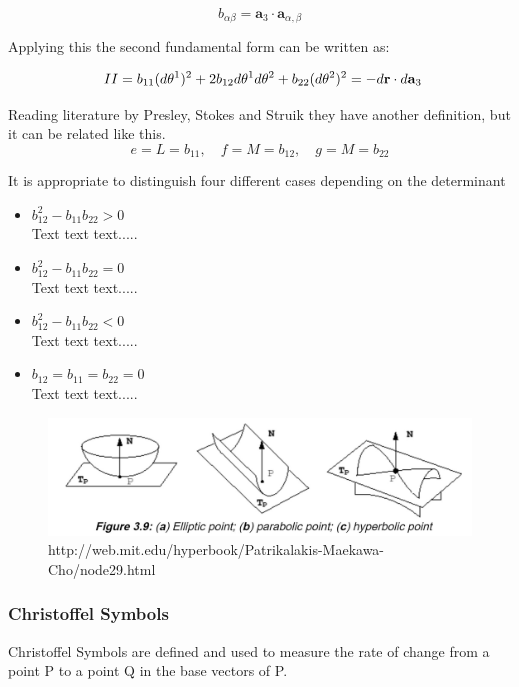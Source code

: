 \begin{equation}
b_{\alpha\beta} = \textbf{a}_3 \cdot \textbf{a}_{\alpha,\beta} 
\end{equation}

Applying this the second fundamental form can be written as:

$$ ~\upperRomannumeral{2} = b_{11}(d\theta^1)^2 + 2b_{12}d\theta^1 d\theta^2 + b_{22}(d\theta^2)^2 = -d\textbf{r}\cdot d\textbf{a}_3$$

Reading literature by Presley, Stokes and Struik they have another definition, but it can be related like this.
$$ e = L = b_{11} ,\quad  f= M = b_{12},\quad
 g = M = b_{22}$$


It is appropriate to distinguish four different cases depending on the determinant

\begin{itemize}
\item $b_{12}^2 - b_{11}b_{22} > 0$ \\
Text text text.....
\item $b_{12}^2 - b_{11}b_{22} = 0$ \\
Text text text.....
\item $b_{12}^2 - b_{11}b_{22} < 0$ \\
Text text text.....
\item $b_{12} = b_{11} = b_{22} = 0$ \\
Text text text.....
\end{itemize}



\begin{figure}[H]
\centering
\includegraphics[width = 1\linewidth ]{figure/Theory/SecondFF2.JPG}
\caption{http://web.mit.edu/hyperbook/Patrikalakis-Maekawa-Cho/node29.html}
\end{figure}

\subsubsection{Christoffel Symbols}

Christoffel Symbols are defined and used to measure the rate of change from a point P to a point Q in the base vectors of P.



